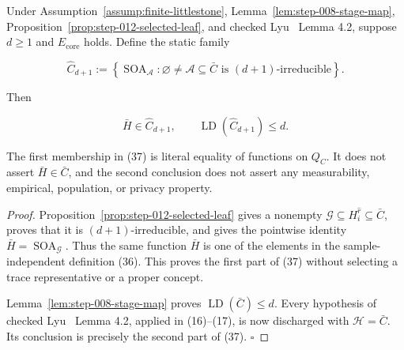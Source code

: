 \begin{proposition}\label{prop:step-012-fixed-family}
Under Assumption~\ref{assump:finite-littlestone}, Lemma~\ref{lem:step-008-stage-map},
Proposition~\ref{prop:step-012-selected-leaf}, and checked Lyu~\citep{lyu2025} Lemma 4.2,
suppose \(d\ge1\) and \(E_{\mathrm{core}}\) holds. Define the static family

\[
 \widehat C_{d+1}
 :=\left\{\operatorname{SOA}_{\mathcal A}:
       \varnothing\ne\mathcal A\subseteq\bar C
       \text{ is }(d+1)\text{-irreducible}\right\}.
\tag{36}
\]

Then

\[
 \bar H\in\widehat C_{d+1},
 \qquad
 \operatorname{LD}(\widehat C_{d+1})\le d.
\tag{37}
\]

The first membership in (37) is literal equality of functions on \(Q_C\).
It does not assert \(\bar H\in\bar C\), and the second conclusion does not
assert any measurability, empirical, population, or privacy property.


\end{proposition}

\begin{proof}
Proposition~\ref{prop:step-012-selected-leaf} gives a nonempty
\(\mathcal G\subseteq H_i^{\widehat r}\subseteq\bar C\), proves that it
is \((d+1)\)-irreducible, and gives the pointwise identity
\(\bar H=\operatorname{SOA}_{\mathcal G}\). Thus the same function
\(\bar H\) is one of the elements in the sample-independent definition
(36). This proves the first part of (37) without selecting a trace
representative or a proper concept.

Lemma~\ref{lem:step-008-stage-map} proves
\(\operatorname{LD}(\bar C)\le d\). Every hypothesis of checked Lyu~\citep{lyu2025}
Lemma 4.2, applied in (16)--(17), is now discharged with
\(\mathcal H=\bar C\). Its conclusion is precisely the second part of
(37). \(\square\)


\end{proof}

